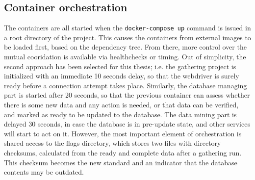 \subsection{Container orchestration}
\label{container_orchestration}
The containers are all started when the \texttt{docker-compose up} command is issued in a root directory of the project. This causes the containers from external images to be loaded first, based on the dependency tree. From there, more control over the mutual cooridation is available via healthchecks or timing. Out of simplicity, the second approach has been selected for this thesis; i.e. the gathering project is initialized with an immediate 10 seconds delay, so that the webdriver is surely ready before a connection attempt takes place. Similarly, the database managing part is started after 20 seconds, so that the previous container can assess whether there is some new data and any action is needed, or that data can be verified, and marked as ready to be updated to the database. The data mining part is delayed 30 seconds, in case the database is in pre-update state, and other services will start to act on it. However, the most important element of orchestration is shared access to the flags directory, which stores two files with directory checksums, calculated from the ready and complete data after a gathering run. This checksum becomes the new standard and an indicator that the database contents may be outdated.


